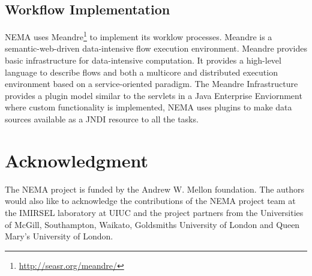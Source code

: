 \documentclass[conference]{IEEEtran}
\begin{document}
\subsection{Workflow Implementation}
NEMA uses Meandre\footnote{\url{http://seasr.org/meandre/}} to implement its worklow processes. Meandre is a semantic-web-driven data-intensive flow execution environment. Meandre provides basic infrastructure for data-intensive computation. It provides a high-level language to describe flows and both a multicore and distributed execution environment based on a service-oriented paradigm. The Meandre Infrastructure provides a plugin model similar to the servlets in a Java Enterprise Enviornment where custom functionality is implemented, NEMA uses plugins to make data sources available as a JNDI \cite{lee2000jndi} resource to all the tasks.
%
%
%

\section*{Acknowledgment}
The NEMA project is funded by the Andrew W. Mellon foundation. The authors would also like to acknowledge the contributions of the NEMA project team at the IMIRSEL laboratory at UIUC and the project partners from the Universities of McGill, Southampton, Waikato, Goldsmiths University of London and Queen Mary's University of London.
\end{document}
